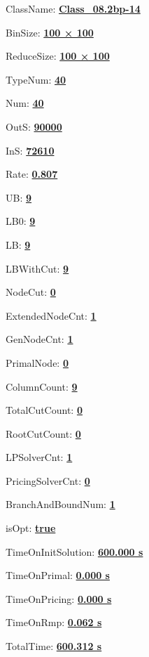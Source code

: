 \documentclass[11pt]{article}
\begin{document}
\pagestyle{empty}


ClassName: \underline{\textbf{Class_08.2bp-14}}
\par
BinSize: \underline{\textbf{100 × 100}}
\par
ReduceSize: \underline{\textbf{100 × 100}}
\par
TypeNum: \underline{\textbf{40}}
\par
Num: \underline{\textbf{40}}
\par
OutS: \underline{\textbf{90000}}
\par
InS: \underline{\textbf{72610}}
\par
Rate: \underline{\textbf{0.807}}
\par
UB: \underline{\textbf{9}}
\par
LB0: \underline{\textbf{9}}
\par
LB: \underline{\textbf{9}}
\par
LBWithCut: \underline{\textbf{9}}
\par
NodeCut: \underline{\textbf{0}}
\par
ExtendedNodeCnt: \underline{\textbf{1}}
\par
GenNodeCnt: \underline{\textbf{1}}
\par
PrimalNode: \underline{\textbf{0}}
\par
ColumnCount: \underline{\textbf{9}}
\par
TotalCutCount: \underline{\textbf{0}}
\par
RootCutCount: \underline{\textbf{0}}
\par
LPSolverCnt: \underline{\textbf{1}}
\par
PricingSolverCnt: \underline{\textbf{0}}
\par
BranchAndBoundNum: \underline{\textbf{1}}
\par
isOpt: \underline{\textbf{true}}
\par
TimeOnInitSolution: \underline{\textbf{600.000 s}}
\par
TimeOnPrimal: \underline{\textbf{0.000 s}}
\par
TimeOnPricing: \underline{\textbf{0.000 s}}
\par
TimeOnRmp: \underline{\textbf{0.062 s}}
\par
TotalTime: \underline{\textbf{600.312 s}}
\par
\newpage


\end{document}
